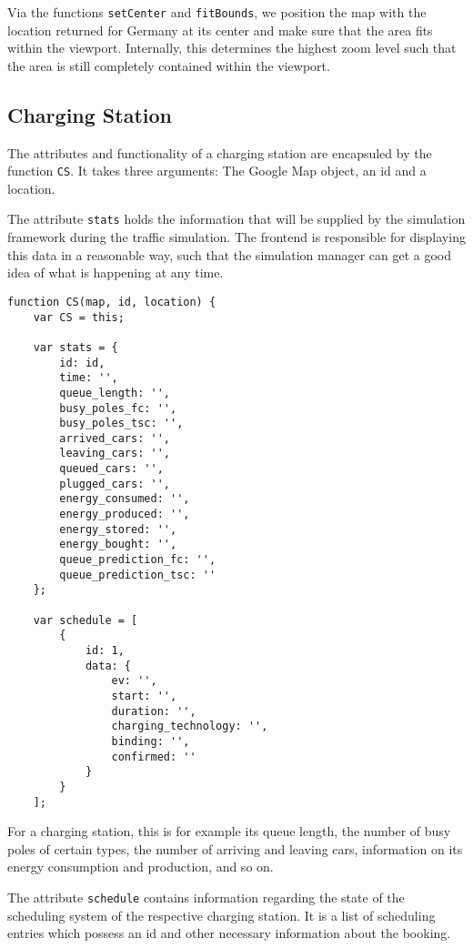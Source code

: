 Via the functions \texttt{setCenter} and \texttt{fitBounds}, we position the map with the location returned for Germany at its center and make sure that the area fits within the viewport. Internally, this determines the highest zoom level such that the area is still completely contained within the viewport.


\subsection{Charging Station}

The attributes and functionality of a charging station are encapsuled by the function \texttt{CS}. It takes three arguments: The Google Map object, an id and a location.

The attribute \texttt{stats} holds the information that will be supplied by the simulation framework during the traffic simulation. The frontend is responsible for displaying this data in a reasonable way, such that the simulation manager can get a good idea of what is happening at any time.

\begin{verbatim}
function CS(map, id, location) {
    var CS = this;

    var stats = {
        id: id,
        time: '',
        queue_length: '',
        busy_poles_fc: '',
        busy_poles_tsc: '',
        arrived_cars: '',
        leaving_cars: '',
        queued_cars: '',
        plugged_cars: '',
        energy_consumed: '',
        energy_produced: '',
        energy_stored: '',
        energy_bought: '',
        queue_prediction_fc: '',
        queue_prediction_tsc: ''
    };

    var schedule = [
        {
            id: 1,
            data: {
                ev: '',
                start: '',
                duration: '',
                charging_technology: '',
                binding: '',
                confirmed: ''
            }
        }
    ];
\end{verbatim}

For a charging station, this is for example its queue length, the number of busy poles of certain types, the number of arriving and leaving cars, information on its energy consumption and production, and so on.

The attribute \texttt{schedule} contains information regarding the state of the scheduling system of the respective charging station. It is a list of scheduling entries which possess an id and other necessary information about the booking.

